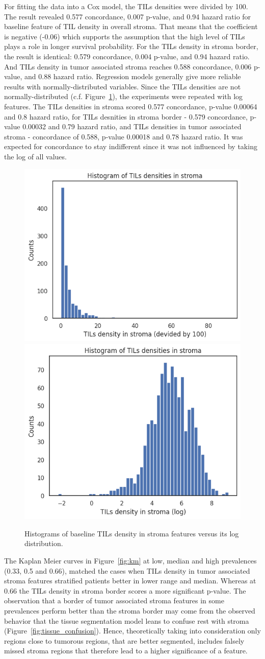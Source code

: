 For fitting the data into a Cox model, the TILs densities were divided by 100.
The result revealed 0.577 concordance, 0.007 p-value, and 0.94 hazard ratio for baseline feature
of TIL density in overall stroma.
That means that the coefficient is negative (-0.06) which supports the assumption
that the high level of TILs plays a role in longer survival probability.
For the TILs density in stroma border, the result is identical: 0.579 concordance,
0.004 p-value, and 0.94 hazard ratio. And TILs density in tumor associated stroma
reaches 0.588 concordance, 0.006 p-value, and 0.88 hazard ratio.
Regression models generally give more reliable results with normally-distributed variables.
Since the TILs densities are not normally-distributed (c.f. Figure~\ref{fig:histo_tils}),
the experiments were repeated with log features. The TILs densities in stroma scored
0.577 concordance, p-value 0.00064 and 0.8 hazard ratio, for TILs desnities in stroma border - 0.579
concordance, p-value 0.00032 and 0.79 hazard ratio, and TILs densities in tumor
associated stroma - concordance of 0.588, p-value 0.00018 and 0.78 hazard ratio.
It was expected for concordance to stay indifferent since it was not influenced by
taking the log of all values.
\begin{figure}[H]
\centering
\includegraphics[width=0.4\linewidth]{figures/survival/histo_tils.png}
\includegraphics[width=0.4\linewidth]{figures/survival/histo_tils_log.png}
\caption{Histograms of baseline TILs density in stroma features versus its log distribution.}
\label{fig:histo_tils}
\end{figure}
The Kaplan Meier curves in Figure~\ref{fig:km} at low, median and high prevalences
(0.33, 0.5 and 0.66), matched the cases when TILs density in tumor associated
stroma features stratified patients better in lower range and median.
Whereas at 0.66 the TILs density in stroma border scores a more significant p-value.
The observation that a border of tumor associated stroma features in some prevalences perform better
than the stroma border may come from the observed behavior that the tissue segmentation model
leans to confuse rest with stroma (Figure~\ref{fig:tissue_confusion}). 
Hence, theoretically taking into consideration only regions close to tumorous regions, that are better
segmented, includes falsely missed stroma regions that therefore lead to a higher
significance of a feature.

